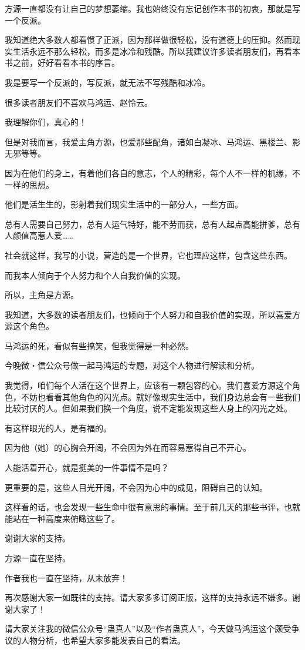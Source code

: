 \begin{this_body}
方源一直都没有让自己的梦想萎缩。我也始终没有忘记创作本书的初衷，那就是写一个反派。

我知道绝大多数人都看惯了正派，因为那样做很轻松，没有道德上的压抑。然而现实生活永远不那么轻松，而多是冰冷和残酷。所以我建议许多读者朋友们，再看本书之前，好好看看本书的序言。

我是要写一个反派的，写反派，就无法不写残酷和冰冷。

很多读者朋友们不喜欢马鸿运、赵怜云。

我理解你们，真心的！

但是对我而言，我爱主角方源，也爱那些配角，诸如白凝冰、马鸿运、黑楼兰、影无邪等等。

因为在他们的身上，有着他们各自的意志，个人的精彩，每个人不一样的机缘，不一样的思想。

他们是活生生的，影射着我们现实生活中的一部分人，一些方面。

总有人需要自己努力，总有人运气特好，能不劳而获，总有人起点高能拼爹，总有人颜值高惹人爱……

社会就这样，我写的小说，营造的是一个世界，它也理应这样，包含这些东西。

而我本人倾向于个人努力和个人自我价值的实现。

所以，主角是方源。

我知道，大多数的读者朋友们，也倾向于个人努力和自我价值的实现，所以喜爱方源这个角色。

马鸿运的死，看似有些搞笑，但我觉得是一种必然。

今晚微・信公众号做一起马鸿运的专题，对这个人物进行解读和分析。

我觉得，咱们每个人活在这个世界上，应该有一颗包容的心。我们喜爱方源这个角色，不妨也看看其他角色的闪光点。就好像现实生活中，我们身边总会有一些我们比较讨厌的人。但如果我们换一个角度，说不定能发现这些人身上的闪光之处。

有这样眼光的人，是有福的。

因为他（她）的心胸会开阔，不会因为外在而容易惹得自己不开心。

人能活着开心，就是挺美的一件事情不是吗？

更重要的是，这些人目光开阔，不会因为心中的成见，阻碍自己的认知。

这样看的话，也会发现一些生命中很有意思的事情。至于前几天的那些书评，也就能站在一种高度来俯瞰这些了。

谢谢大家的支持。

方源一直在坚持。

作者我也一直在坚持，从未放弃！

再次感谢大家一如既往的支持。请大家多多订阅正版，这样的支持永远不嫌多。谢谢大家了！

请大家关注我的微信公众号“蛊真人”以及“作者蛊真人”，今天做马鸿运这个颇受争议的人物分析，也希望大家多能发表自己的看法。

\end{this_body}

